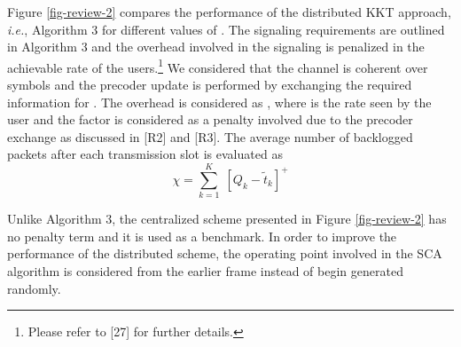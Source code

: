 \begin{enumerate}
	Figure \ref{fig-review-2} compares the performance of the distributed \ac{KKT} approach, \textit{i.e.}, Algorithm 3 for different values of . The signaling requirements are outlined in Algorithm 3 and the overhead involved in the signaling is penalized in the achievable rate of the users.\footnote{Please refer to [27] for further details.} We considered that the channel is coherent over  symbols and the precoder update is performed by exchanging the required information for . The overhead is considered as , where  is the rate seen by the user and the factor  is considered as a penalty involved due to the precoder exchange as discussed in [R2] and [R3]. The average number of backlogged packets after each transmission slot is evaluated as 
	\begin{equation}
	\chi = \sum_{k = 1}^K \; [ Q_k - \tilde{t}_k ]^+
	\end{equation}
	
	Unlike Algorithm 3, the centralized scheme presented in Figure \ref{fig-review-2} has no penalty term and it is used as a benchmark. In order to improve the performance of the distributed scheme, the operating point involved in the \ac{SCA} algorithm is considered from the earlier frame instead of begin generated randomly. 
	
	\begin{comment}
	Since we use \ac{KKT} approach, we can either use all users in the system for the precoder design or we can utilize single-cell MU-MIMO user selection presented in the literature to limit the number of users for which the precoders are designed, which leads to the faster convergence. As we can see from Figure \ref{fig-review-2}, as the arrival rate per user increases, the performance of \ac{KKT} schemes with \eqn{J_{\max} = 3,5,10} converges since the number of backlogged packets are significantly large, therefore, the same set of users will be served by the algorithm with better precoders by utilizing the memory. 
	
	In spite of using memory and prior scheduling in the \ac{KKT} approach, isolated single \ac{BS} processing performs much better than the distributed scheme due to the limited number of iterations allowed in the algorithm. Note that the precoders are not updated for the desired users until convergence, after the limited number of iterations. However, if we perform the single cell precoder design by considering the neighboring precoders as fixed after the recent exchange as discussed in [28], we can improve the performance significantly for Algorithm 3 as shown by red curves in Figure \ref{fig-review-2}. In this approach, in between each exchange across the coordinating \acp{BS}, each \ac{BS} will perform \eqn{J_{\max} = 20} with the neighboring precoders as fixed. Once the iterations are performed to update the precoders, it is then exchanged across the coordinating \acp{BS} to perform the same procedure as mentioned earlier. 
	\end{comment}
	

\end{enumerate}
